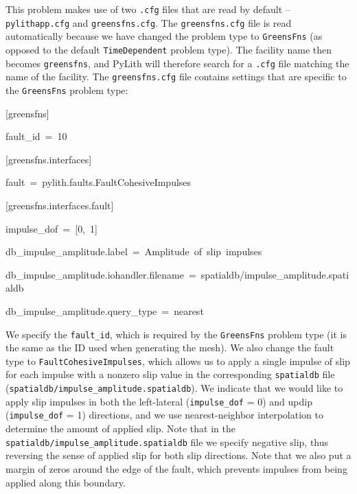 This problem makes use of two \texttt{.cfg} files that are read by
default -- \texttt{pylithapp.cfg} and \texttt{greensfns.cfg}. The
\texttt{greensfns.cfg} file is read automatically because we have
changed the problem type to \texttt{GreensFns} (as opposed to the
default \texttt{TimeDependent} problem type). The facility name then
becomes \texttt{greensfns}, and PyLith will therefore search for a
\texttt{.cfg} file matching the name of the facility. The \texttt{greensfns.cfg}
file contains settings that are specific to the \texttt{GreensFns}
problem type:
\begin{lyxcode}
{[}greensfns{]}

fault\_id~=~10



{[}greensfns.interfaces{]}

fault~=~pylith.faults.FaultCohesiveImpulses



{[}greensfns.interfaces.fault{]}

impulse\_dof~=~{[}0,~1{]}

db\_impulse\_amplitude.label~=~Amplitude~of~slip~impulses

db\_impulse\_amplitude.iohandler.filename~=~spatialdb/impulse\_amplitude.spatialdb

db\_impulse\_amplitude.query\_type~=~nearest~
\end{lyxcode}
We specify the \texttt{fault\_id}, which is required by the \texttt{GreensFns}
problem type (it is the same as the ID used when generating the mesh).
We also change the fault type to \texttt{FaultCohesiveImpulses}, which
allows us to apply a single impulse of slip for each impulse with
a nonzero slip value in the corresponding \texttt{spatialdb} file
(\texttt{spatialdb/impulse\_amplitude.spatialdb}). We indicate that
we would like to apply slip impulses in both the left-lateral (\texttt{impulse\_dof}
= 0) and updip (\texttt{impulse\_dof} = 1) directions, and we use
nearest-neighbor interpolation to determine the amount of applied
slip. Note that in the \texttt{spatialdb/impulse\_amplitude.spatialdb}
file we specify negative slip, thus reversing the sense of applied
slip for both slip directions. Note that we also put a margin of zeros
around the edge of the fault, which prevents impulses from being applied
along this boundary.

